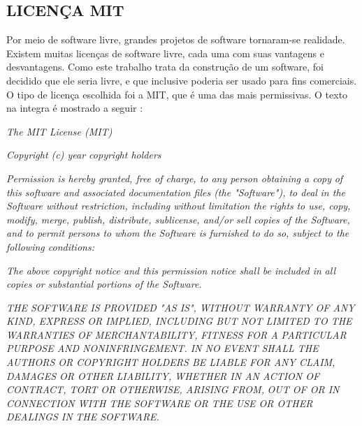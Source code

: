 \subsection{LICENÇA MIT}
\label{mit_sec}

Por meio de software livre, grandes projetos de software tornaram-se realidade. Existem muitas licenças de software livre, cada uma com suas vantagens e desvantagens. Como este trabalho trata da construção de um software, foi decidido que ele seria livre, e que inclusive poderia ser usado para fins comerciais. O tipo de licença escolhida foi a MIT, que é uma das mais permissivas. O texto na integra é mostrado a seguir \cite{MIT2015}:

\begin{citacao}

\newpage

\emph{The MIT License (MIT)}

\emph{Copyright (c) year copyright holders}

\emph{Permission is hereby granted, free of charge, to any person obtaining a copy}
\emph{of this software and associated documentation files (the "Software"), to deal}
\emph{in the Software without restriction, including without limitation the rights}
\emph{to use, copy, modify, merge, publish, distribute, sublicense, and/or sell}
\emph{copies of the Software, and to permit persons to whom the Software is}
\emph{furnished to do so, subject to the following conditions:}

\emph{The above copyright notice and this permission notice shall be included in}
\emph{all copies or substantial portions of the Software.}

\emph{THE SOFTWARE IS PROVIDED "AS IS", WITHOUT WARRANTY OF ANY KIND, EXPRESS OR}
\emph{IMPLIED, INCLUDING BUT NOT LIMITED TO THE WARRANTIES OF MERCHANTABILITY,}
\emph{FITNESS FOR A PARTICULAR PURPOSE AND NONINFRINGEMENT. IN NO EVENT SHALL THE}
\emph{AUTHORS OR COPYRIGHT HOLDERS BE LIABLE FOR ANY CLAIM, DAMAGES OR OTHER}
\emph{LIABILITY, WHETHER IN AN ACTION OF CONTRACT, TORT OR OTHERWISE, ARISING FROM,}
\emph{OUT OF OR IN CONNECTION WITH THE SOFTWARE OR THE USE OR OTHER DEALINGS IN}
\emph{THE SOFTWARE.}

\end{citacao}
